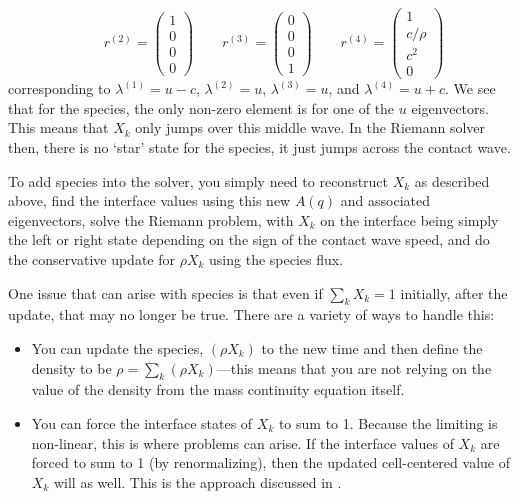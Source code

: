 \begin{itemize}
\begin{equation}
%
\qquad
r^{(2)} = \left ( \begin{array}{c} 1 \\ 0 \\ 0  \\ 0\end{array} \right )
%
\qquad
r^{(3)} = \left ( \begin{array}{c} 0 \\ 0  \\ 0 \\ 1 \end{array} \right )
%
\qquad
r^{(4)} = \left ( \begin{array}{c} 1 \\ c/\rho \\ c^2 \\ 0 \end{array} \right )
\end{equation}
corresponding to $\lambda^{(1)} = u -c$, $\lambda^{(2)} = u$,
$\lambda^{(3)} = u$, and $\lambda^{(4)} = u + c$.  We see that for the
species, the only non-zero element is for one of the $u$ eigenvectors.
This means that $X_k$ only jumps over this middle wave.  In the
Riemann solver then, there is no `star' state for the species, it just
jumps across the contact wave.

To add species into the solver, you simply need to reconstruct $X_k$
as described above, find the interface values using this new $A(q)$
and associated eigenvectors, solve the Riemann problem, with $X_k$ on
the interface being simply the left or right state depending on the
sign of the contact wave speed, and do the conservative update for
$\rho X_k$ using the species flux.

One issue that can arise with species is that even if $\sum_k X_k = 1$
initially, after the update, that may no longer be true.  There are a 
variety of ways to handle this:
\begin{itemize}
\item You can update the species, $(\rho X_k)$ to the new time and then
define the density to be $\rho = \sum_k (\rho X_k)$---this means that
you are not relying on the value of the density from the mass continuity
equation itself.  

\item You can force the interface states of $X_k$ to sum to 1.  Because
the limiting is non-linear, this is where problems can arise.  If the 
interface values of $X_k$ are forced to sum to 1 (by renormalizing), then
the updated cell-centered value of $X_k$ will as well.  This is the
approach discussed in \cite{plewamuller:1999}.


\end{itemize}
\end{itemize}
